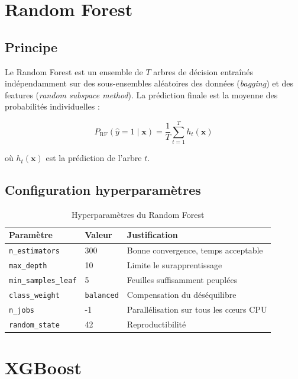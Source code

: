 \documentclass[12pt,a4paper,twoside]{report}
\theoremstyle{definition}
\begin{document}
\section{Random Forest}

\subsection{Principe}

Le Random Forest est un ensemble de $T$ arbres de décision entraînés
indépendamment sur des sous-ensembles aléatoires des données (\textit{bagging})
et des features (\textit{random subspace method}). La prédiction finale est
la moyenne des probabilités individuelles :

\begin{equation}
P_{\text{RF}}(\hat{y}=1 \mid \mathbf{x}) = \frac{1}{T} \sum_{t=1}^{T} h_t(\mathbf{x})
\label{eq:rf}
\end{equation}

où $h_t(\mathbf{x})$ est la prédiction de l'arbre $t$.

\subsection{Configuration hyperparamètres}

\begin{table}[H]
\centering
\caption{Hyperparamètres du Random Forest}
\label{tab:rf_params}
\renewcommand{\arraystretch}{1.3}
\begin{tabular}{lll}
\toprule
\textbf{Paramètre} & \textbf{Valeur} & \textbf{Justification} \\
\midrule
\texttt{n\_estimators} & 300 & Bonne convergence, temps acceptable \\
\texttt{max\_depth}    & 10  & Limite le surapprentissage \\
\texttt{min\_samples\_leaf} & 5 & Feuilles suffisamment peuplées \\
\texttt{class\_weight} & \texttt{balanced} & Compensation du déséquilibre \\
\texttt{n\_jobs}       & -1  & Parallélisation sur tous les cœurs CPU \\
\texttt{random\_state} & 42  & Reproductibilité \\
\bottomrule
\end{tabular}
\end{table}

\section{XGBoost}
\end{document}
